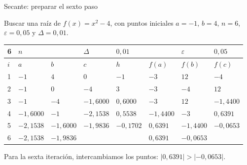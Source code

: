 \documentclass[main.tex]{subfiles}
\begin{document}
\begin{frame}[t]{Secante: preparar el sexto paso}
\begin{minipage}[t][13mm][t]{\textwidth}\small Buscar una raíz de $f(x)=x^2-4$, con puntos iniciales $a=-1$, $b=4$, $n=6$, $\varepsilon=0{,}05$ y $\Delta=0{,}01$.\end{minipage}\par{\scriptsize\setlength{\tabcolsep}{2pt}\renewcommand{\arraystretch}{1}\begin{center}\begin{tabular}{|C{.04\textwidth}|C{.112\textwidth}|C{.112\textwidth}|C{.112\textwidth}|C{.112\textwidth}|C{.112\textwidth}|C{.112\textwidth}|C{.112\textwidth}|}
\hline
\rule{0pt}{4.3mm}6 & $n$ &  &  $\Delta$  & $0{,}01$ &  & $\varepsilon$ & $0{,}05$\\\hline
\rule{0pt}{4.3mm}$i$ & $a$ & $b$ & $c$ & $h$ & $f(a)$ & $f(b)$ & $f(c)$\\\hline
\rule{0pt}{4.3mm}1 & $-1$ & $4$ & $0$ & $-1$ & $-3$ & $12$ & $-4$\\\hline
\rule{0pt}{4.3mm}2 & $-1$ & $0$ & $-4$ & $3$ & $-3$ & $-4$ & $12$\\\hline
\rule{0pt}{4.3mm}3 & $-1$ & $-4$ & $-1{,}6000$ & $0{,}6000$ & $-3$ & $12$ & $-1{,}4400$\\\hline
\rule{0pt}{4.3mm}4 & $-1{,}6000$ & $-1$ & $-2{,}1538$ & $0{,}5538$ & $-1{,}4400$ & $-3$ & $0{,}6391$\\\hline
\rule{0pt}{4.3mm}5 & $-2{,}1538$ & $-1{,}6000$ & $-1{,}9836$ & $-0{,}1702$ & $0{,}6391$ & $-1{,}4400$ & $-0{,}0653$\\\hline
\rule{0pt}{4.3mm}6 & $-2{,}1538$ & $-1{,}9836$ &  &  & $0{,}6391$ & $-0{,}0653$ & \\\hline
\end{tabular}\end{center}}\begin{minipage}[t][10mm][t]{\textwidth}\footnotesize Para la sexta iteración, intercambiamos los puntos: $|0{,}6391|>|-0{,}0653|$.\end{minipage}
\end{frame}
\end{document}

